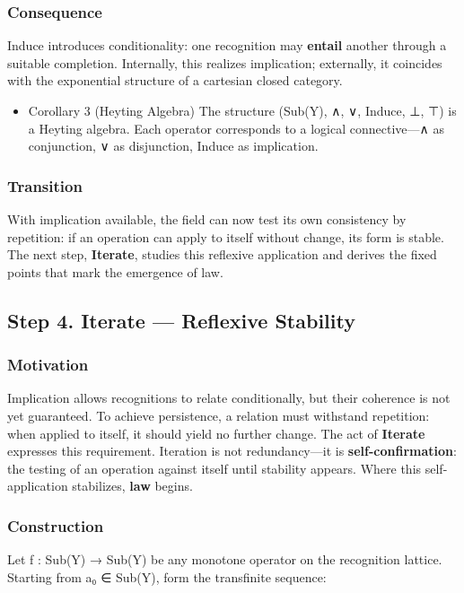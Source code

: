 \documentclass[11pt]{article}
\begin{document}
\subsubsection*{Consequence}
\label{sec:org24bb1ff}
Induce introduces conditionality: one recognition may \textbf{entail} another through a suitable completion.  
Internally, this realizes implication; externally, it coincides with the exponential structure of a cartesian closed category.
\begin{itemize}
\item Corollary 3 (Heyting Algebra)
\label{sec:org63b260f}
The structure (Sub(Y), ∧, ∨, Induce, ⊥, ⊤) is a Heyting algebra.  
Each operator corresponds to a logical connective—∧ as conjunction, ∨ as disjunction, Induce as implication.
\end{itemize}
\subsubsection*{Transition}
\label{sec:org9615fd1}
With implication available, the field can now test its own consistency by repetition:  
if an operation can apply to itself without change, its form is stable.  
The next step, \textbf{Iterate}, studies this reflexive application and derives the fixed points that mark the emergence of law.
\subsection*{Step 4. Iterate — Reflexive Stability}
\label{sec:orged8f4ab}

\subsubsection*{Motivation}
\label{sec:org19a1957}
Implication allows recognitions to relate conditionally, but their coherence is not yet guaranteed.  
To achieve persistence, a relation must withstand repetition: when applied to itself, it should yield no further change.  
The act of \textbf{Iterate} expresses this requirement.  
Iteration is not redundancy—it is \textbf{self-confirmation}: the testing of an operation against itself until stability appears.  
Where this self-application stabilizes, \textbf{law} begins.
\subsubsection*{Construction}
\label{sec:orgd304d5b}
Let f : Sub(Y) → Sub(Y) be any monotone operator on the recognition lattice.  
Starting from a₀ ∈ Sub(Y), form the transfinite sequence:
\end{document}

